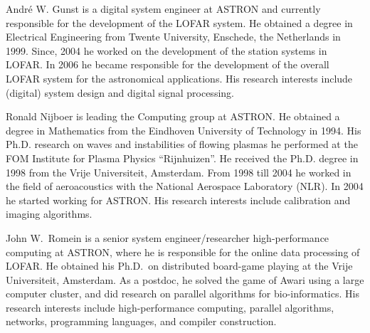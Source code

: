 \documentclass[journal]{IEEEtran}
\begin{document}
\begin{IEEEbiography}{Andr\'{e} W. Gunst}
is a digital system engineer at ASTRON and currently responsible for the development of the LOFAR system. He obtained a degree in Electrical Engineering from Twente University, Enschede, the Netherlands in 1999. Since, 2004 he worked on the development of the station systems in LOFAR. In 2006 he became responsible for the development of the overall LOFAR system for the astronomical applications. His research interests include (digital) system design and digital signal processing.
\end{IEEEbiography}

\begin{IEEEbiography}{Ronald Nijboer}
is leading the Computing group at ASTRON. He obtained a degree in Mathematics from the Eindhoven University of Technology in 1994. His Ph.D. research on waves and instabilities of flowing  plasmas he performed at the FOM Institute for Plasma Physics ``Rijnhuizen''. He received the Ph.D. degree in 1998 from the Vrije Universiteit, Amsterdam. From 1998 till 2004 he worked in the field of aeroacoustics with the National Aerospace Laboratory (NLR). In 2004 he started working for ASTRON. His research interests include calibration and imaging algorithms.  
\end{IEEEbiography}




\begin{IEEEbiography}{John W.\ Romein}
is a senior system engineer/researcher high-performance
computing at ASTRON, where he is responsible for the online data processing
of LOFAR.
He obtained his Ph.D.\ on distributed board-game playing at the Vrije
Universiteit, Amsterdam.
As a postdoc, he solved the game of Awari using a large computer cluster,
and did research on parallel algorithms for bio-informatics.
His research interests include high-performance computing, parallel algorithms,
networks, programming languages, and compiler construction.
\end{IEEEbiography}






\end{document}
